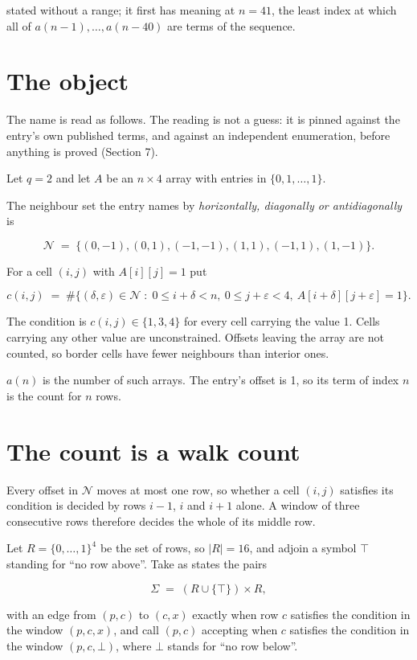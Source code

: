 \documentclass[11pt]{article}
\theoremstyle{definition}
\begin{document}
stated without a range; it first has meaning at $n = 41$, the least index at which all of $a(n-1),\dots,a(n-40)$ are terms of the sequence.

\section{The object}

The name is read as follows. The reading is not a guess: it is pinned against the entry's own published terms, and against an independent enumeration, before anything is proved (Section 7).

Let $q = 2$ and let $A$ be an $n \times 4$ array with entries in $\{0,1,\dots,1\}$.

The neighbour set the entry names by {\itshape horizontally, diagonally or antidiagonally} is

\[\mathcal{N} \;=\; \{(0,-1), (0,1), (-1,-1), (1,1), (-1,1), (1,-1)\}.\]

For a cell $(i,j)$ with $A[i][j] = 1$ put

\[c(i,j) \;=\; \#\bigl\{(\delta,\varepsilon)\in\mathcal{N} \;:\; 0\le i+\delta<n,\ 0\le j+\varepsilon<4,\ A[i+\delta][j+\varepsilon] = 1\bigr\}.\]

The condition is $c(i,j) \in \{1, 3, 4\}$ for every cell carrying the value 1. Cells carrying any other value are unconstrained. Offsets leaving the array are not counted, so border cells have fewer neighbours than interior ones.

$a(n)$ is the number of such arrays. The entry's offset is 1, so its term of index $n$ is the count for $n$ rows.

\section{The count is a walk count}

Every offset in $\mathcal{N}$ moves at most one row, so whether a cell $(i,j)$ satisfies its condition is decided by rows $i-1$, $i$ and $i+1$ alone. A window of three consecutive rows therefore decides the whole of its middle row.

Let $R = \{0,\dots,1\}^{4}$ be the set of rows, so $|R| = 16$, and adjoin a symbol $\top$ standing for ``no row above''. Take as states the pairs

\[\Sigma \;=\; (R \cup \{\top\}) \times R,\]

with an edge from $(p,c)$ to $(c,x)$ exactly when row $c$ satisfies the condition in the window $(p,c,x)$, and call $(p,c)$ accepting when $c$ satisfies the condition in the window $(p,c,\bot)$, where $\bot$ stands for ``no row below''.
\end{document}
